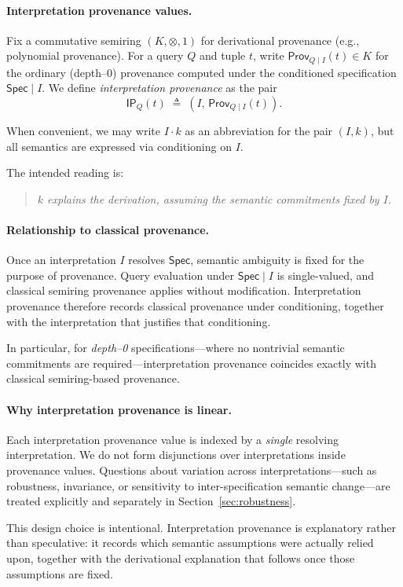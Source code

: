 \documentclass[acmsmall,nonacm]{acmart}
\theoremstyle{remark}
\numberwithin{definition}{section}
\numberwithin{theorem}{section}
\numberwithin{lemma}{section}
\numberwithin{corollary}{section}
\numberwithin{remark}{section}
\numberwithin{example}{section}
\numberwithin{observation}{section}
\numberwithin{assumption}{section}
\newcommand{\Spec}{\mathsf{Spec}}
\newcommand{\Prov}{\mathsf{Prov}}
\begin{document}
\paragraph{Interpretation provenance values.}
Fix a commutative semiring $(K,\otimes,1)$ for derivational provenance
(e.g., polynomial provenance).
For a query $Q$ and tuple $t$, write $\Prov_{Q \mid I}(t) \in K$ for the
ordinary (depth--0) provenance computed under the conditioned specification
$\Spec \mid I$.
We define \emph{interpretation provenance} as the pair
\[
  \mathsf{IP}_Q(t) \;\triangleq\; (I,\, \Prov_{Q \mid I}(t)).
\]

When convenient, we may write $I \cdot k$ as an abbreviation for the pair $(I,k)$,
but all semantics are expressed via conditioning on $I$.

The intended reading is:
\begin{quote}
\emph{$k$ explains the derivation, assuming the semantic commitments fixed by $I$.}
\end{quote}

\paragraph{Relationship to classical provenance.}
Once an interpretation $I$ resolves $\Spec$, semantic ambiguity is fixed for the purpose of provenance.
Query evaluation under $\Spec \mid I$ is single-valued, and classical semiring
provenance applies without modification.
Interpretation provenance therefore records classical provenance under
conditioning, together with the interpretation that justifies that conditioning.

In particular, for \emph{depth--0} specifications—where no nontrivial semantic
commitments are required—interpretation provenance coincides exactly with
classical semiring-based provenance.

\paragraph{Why interpretation provenance is linear.}
Each interpretation provenance value is indexed by a \emph{single} resolving
interpretation.
We do not form disjunctions over interpretations inside provenance values.
Questions about variation across interpretations—such as robustness,
invariance, or sensitivity to inter-specification semantic change—are treated explicitly and
separately in Section~\ref{sec:robustness}.

This design choice is intentional.
Interpretation provenance is explanatory rather than speculative: it records
which semantic assumptions were actually relied upon, together with the
derivational explanation that follows once those assumptions are fixed.
\end{document}
